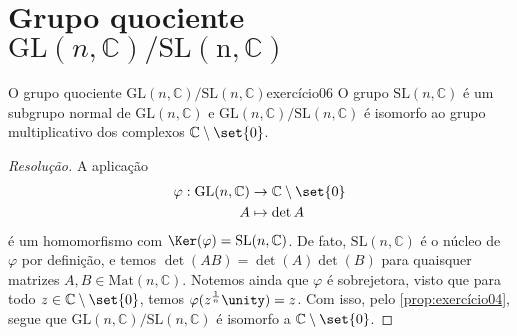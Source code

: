 \section[Grupo quociente GL(n, C)/SL(n, C)]{Grupo quociente \(\mathrm{GL}(n, \mathbb{C})/\mathrm{SL(n, \mathbb{C})}\)}
\begin{proposition}{O grupo quociente \(\mathrm{GL}(n,\mathbb{C})/\mathrm{SL}(n,\mathbb{C})\)}{exercício06}
    O grupo \(\mathrm{SL}(n,\mathbb{C})\) é um subgrupo normal de \(\mathrm{GL}(n,\mathbb{C})\) e \(\mathrm{GL}(n,\mathbb{C})/\mathrm{SL}(n,\mathbb{C})\) é isomorfo ao grupo multiplicativo dos complexos \(\mathbb{C}\setminus\set{0}\).
\end{proposition}
\begin{proof}[Resolução]
    A aplicação
    \begin{align*}
        \varphi : \mathrm{GL}(n, \mathbb{C}) &\to \mathbb{C}\setminus\set{0}\\
                                           A &\mapsto \det{A}
    \end{align*}
    é um homomorfismo com \(\Ker(\varphi) = \mathrm{SL}(n,\mathbb{C})\). De fato, \(\mathrm{SL}(n,\mathbb{C})\) é o núcleo de \(\varphi\) por definição, e temos \(\det(AB)=\det(A)\det(B)\) para quaisquer matrizes \(A,B \in \mathrm{Mat}(n,\mathbb{C})\). Notemos ainda que \(\varphi\) é sobrejetora, visto que para todo \(z \in \mathbb{C}\setminus\set{0}\), temos \(\varphi(z^{\frac1n} \unity) = z\). Com isso, pelo \cref{prop:exercício04}, segue que \(\mathrm{GL}(n,\mathbb{C})/\mathrm{SL}(n,\mathbb{C})\) é isomorfo a \(\mathbb{C}\setminus \set{0}\).
\end{proof}
